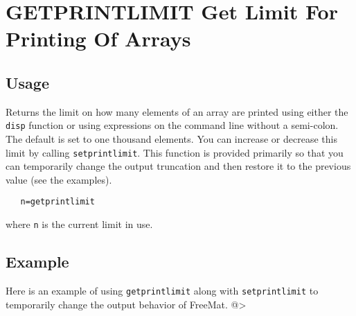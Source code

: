 \section{GETPRINTLIMIT Get Limit For Printing Of Arrays}

\subsection{Usage}

Returns the limit on how many elements of an array are printed
using either the \verb|disp| function or using expressions on the
command line without a semi-colon.  The default is set to 
one thousand elements.  You can increase or decrease this
limit by calling \verb|setprintlimit|.  This function is provided
primarily so that you can temporarily change the output truncation
and then restore it to the previous value (see the examples).
\begin{verbatim}
   n=getprintlimit
\end{verbatim}
where \verb|n| is the current limit in use.
\subsection{Example}

Here is an example of using \verb|getprintlimit| along with \verb|setprintlimit| to temporarily change the output behavior of FreeMat.
@>
